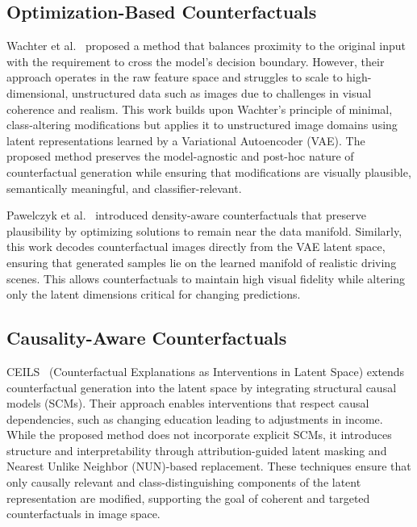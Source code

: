 \subsection{Optimization-Based Counterfactuals}

Wachter et al.~\cite{wachter2018CE} proposed a method that balances proximity to the original input with the requirement to cross the model’s decision boundary. However, their approach operates in the raw feature space and struggles to scale to high-dimensional, unstructured data such as images due to challenges in visual coherence and realism. This work builds upon Wachter’s principle of minimal, class-altering modifications but applies it to unstructured image domains using latent representations learned by a Variational Autoencoder (VAE). The proposed method preserves the model-agnostic and post-hoc nature of counterfactual generation while ensuring that modifications are visually plausible, semantically meaningful, and classifier-relevant.

Pawelczyk et al.~\cite{Pawelczyk_2020} introduced density-aware counterfactuals that preserve plausibility by optimizing solutions to remain near the data manifold. Similarly, this work decodes counterfactual images directly from the VAE latent space, ensuring that generated samples lie on the learned manifold of realistic driving scenes. This allows counterfactuals to maintain high visual fidelity while altering only the latent dimensions critical for changing predictions.

\subsection{Causality-Aware Counterfactuals}

CEILS~\cite{crupi2021counterfactualexplanationsinterventionslatent} (Counterfactual Explanations as Interventions in Latent Space) extends counterfactual generation into the latent space by integrating structural causal models (SCMs). Their approach enables interventions that respect causal dependencies, such as changing education leading to adjustments in income. While the proposed method does not incorporate explicit SCMs, it introduces structure and interpretability through attribution-guided latent masking and Nearest Unlike Neighbor (NUN)-based replacement. These techniques ensure that only causally relevant and class-distinguishing components of the latent representation are modified, supporting the goal of coherent and targeted counterfactuals in image space.

